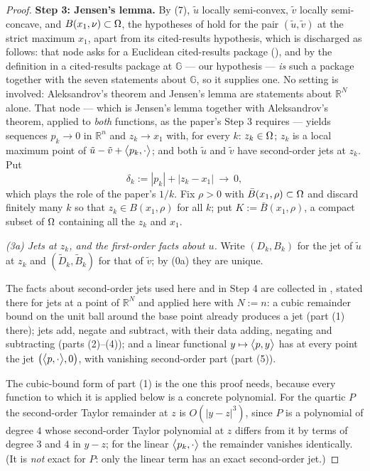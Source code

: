 \begin{proof}
\medskip\noindent\textbf{Step 3: Jensen's lemma.} By (7), $\tilde u$ locally semi-convex,
$\tilde v$ locally semi-concave, and $B(x_1,\nu)\subset\Omega$, the hypotheses of
 hold for the pair $(\tilde u,\tilde v)$ at the strict
maximum $x_1$, apart from its cited-results hypothesis, which is discharged as follows: that
node asks for a Euclidean cited-results package (), and by the
definition in  a cited-results package at $\mathbb G$ --- our
hypothesis --- \emph{is} such a package together with the seven statements about $\mathbb G$,
so it supplies one. No setting is involved: Aleksandrov's theorem and Jensen's lemma are
statements about $\mathbb R^{N}$ alone. That node --- which is Jensen's lemma together with
Aleksandrov's theorem,
applied to \emph{both} functions, as the paper's Step 3 requires --- yields sequences
$p_k\to0$ in $\mathbb R^{n}$ and $z_k\to x_1$ with, for every $k$: $z_k\in\Omega$; $z_k$ is a
local maximum point of $\tilde u-\tilde v+\big\langle p_k,\cdot\big\rangle$; and both $\tilde u$ and
$\tilde v$ have second-order jets at $z_k$. Put
\[
 \delta_k:=|p_k|+|z_k-x_1|\ \longrightarrow\ 0 ,
\]
which plays the role of the paper's $1/k$. Fix $\rho>0$ with $\bar B(x_1,\rho)\subset\Omega$
and discard finitely many $k$ so that $z_k\in B(x_1,\rho)$ for all $k$; put
$K:=\bar B(x_1,\rho)$, a compact subset of $\Omega$ containing all the $z_k$ and $x_1$.

\emph{(3a) Jets at $z_k$, and the first-order facts about $u$.} Write $(D_k,B_k)$ for the
jet of $\tilde u$ at $z_k$ and $(\tilde D_k,\tilde B_k)$ for that of $\tilde v$; by (0a)
they are unique.

The facts about second-order jets used here and in Step 4 are collected in
, stated there for jets at a point of $\mathbb R^{N}$ and
applied here with $N:=n$: a cubic remainder bound on the unit ball around the base point
already produces a jet (part (1) there); jets add, negate and subtract, with their data
adding, negating and subtracting (parts (2)--(4)); and a linear functional
$y\mapsto\big\langle p,y\big\rangle$ has at every point the jet $\big(\big\langle p,\cdot\big\rangle,0\big)$, with vanishing
second-order part (part (5)).

The cubic-bound form of part (1) is the one this proof needs, because every function to
which it is applied below is a concrete polynomial. For the quartic $P$ the second-order
Taylor remainder at $z$ is $O(|y-z|^{3})$, since $P$ is a polynomial of degree $4$ whose
second-order Taylor polynomial at $z$ differs from it by terms of degree $3$ and $4$ in
$y-z$; for the linear $\big\langle p_k,\cdot\big\rangle$ the remainder vanishes identically. (It is
\emph{not} exact for $P$: only the linear term has an exact second-order jet.)


\end{proof}
